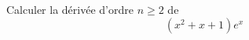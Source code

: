 Calculer la d{\'e}riv{\'e}e d'ordre $n\geq 2$ de 
\begin{displaymath}
 (x^{2}+x+1)e^{x} 
\end{displaymath}
\bigskip\bigskip